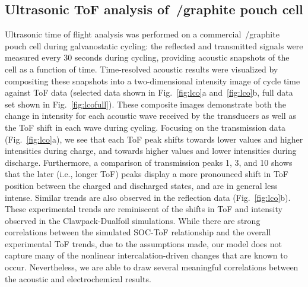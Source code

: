 \subsection{Ultrasonic ToF analysis of~/graphite pouch cell}
Ultrasonic time of flight analysis was performed on a commercial~/graphite pouch cell during galvanostatic cycling: the reflected and transmitted signals were measured every 30 seconds during cycling, providing acoustic snapshots of the cell as a function of time. Time-resolved acoustic results were visualized by compositing these snapshots into a two-dimensional intensity image of cycle time against ToF data (selected data shown in Fig.~\ref{fig:lco}a and~\ref{fig:lco}b, full data set shown in Fig.~\ref{fig:lcofull}). These composite images demonstrate both the change in intensity for each acoustic wave received by the transducers as well as the ToF shift in each wave during cycling. Focusing on the transmission data (Fig.~\ref{fig:lco}a), we see that each ToF peak shifts towards lower values and higher intensities during charge, and towards higher values and lower intensities during discharge. Furthermore, a comparison of transmission peaks 1, 3, and 10 shows that the later (i.e., longer ToF) peaks display a more pronounced shift in ToF position between the charged and discharged states, and are in general less intense. Similar trends are also observed in the reflection data (Fig.~\ref{fig:lco}b). These experimental trends are reminiscent of the shifts in ToF and intensity observed in the Clawpack-Dualfoil simulations. While there are strong correlations between the simulated SOC-ToF relationship and the overall experimental ToF trends, due to the assumptions made, our model does not capture many of the nonlinear intercalation-driven changes that are known to occur. Nevertheless, we are able to draw several meaningful correlations between the acoustic and electrochemical results.

